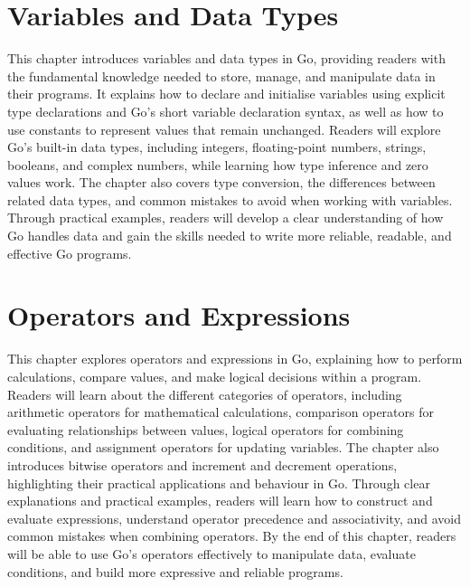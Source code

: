 \documentclass[12pt,oneside]{book}
\begin{document}
\chapter{Variables and Data Types}
\begin{chaptersummary}
This chapter introduces variables and data types in Go, providing readers with the fundamental knowledge needed to store, manage, and manipulate data in their programs. It explains how to declare and initialise variables using explicit type declarations and Go’s short variable declaration syntax, as well as how to use constants to represent values that remain unchanged. Readers will explore Go’s built-in data types, including integers, floating-point numbers, strings, booleans, and complex numbers, while learning how type inference and zero values work. The chapter also covers type conversion, the differences between related data types, and common mistakes to avoid when working with variables. Through practical examples, readers will develop a clear understanding of how Go handles data and gain the skills needed to write more reliable, readable, and effective Go programs.
\end{chaptersummary}


\chapter{Operators and Expressions}
\begin{chaptersummary}
This chapter explores operators and expressions in Go, explaining how to perform calculations, compare values, and make logical decisions within a program. Readers will learn about the different categories of operators, including arithmetic operators for mathematical calculations, comparison operators for evaluating relationships between values, logical operators for combining conditions, and assignment operators for updating variables. The chapter also introduces bitwise operators and increment and decrement operations, highlighting their practical applications and behaviour in Go. Through clear explanations and practical examples, readers will learn how to construct and evaluate expressions, understand operator precedence and associativity, and avoid common mistakes when combining operators. By the end of this chapter, readers will be able to use Go’s operators effectively to manipulate data, evaluate conditions, and build more expressive and reliable programs.
\end{chaptersummary}

\end{document}
